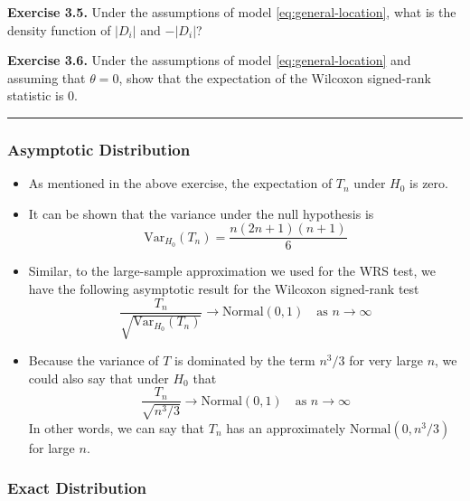 \documentclass[]{book}
\begin{document}
\textbf{Exercise 3.5.} Under the assumptions of model \eqref{eq:general-location}, what is
the density function of \(|D_{i}|\) and \(-|D_{i}|\)?

\textbf{Exercise 3.6.} Under the assumptions of model \eqref{eq:general-location} and
assuming that \(\theta = 0\), show that the expectation of the Wilcoxon signed-rank
statistic is \(0\).

\begin{center}\rule{0.5\linewidth}{\linethickness}\end{center}

\hypertarget{asymptotic-distribution}{%
\subsubsection{Asymptotic Distribution}\label{asymptotic-distribution}}

\begin{itemize}
\item
  As mentioned in the above exercise, the expectation of \(T_{n}\) under \(H_{0}\) is zero.
\item
  It can be shown that the variance under the null hypothesis is
  \begin{equation}
  \textrm{Var}_{H_{0}}( T_{n} ) = \frac{n(2n + 1)(n + 1)}{6} \nonumber
  \end{equation}
\item
  Similar, to the large-sample approximation we used for the WRS test, we have the following
  asymptotic result for the Wilcoxon signed-rank test
  \begin{equation}
  \frac{T_{n}}{\sqrt{\textrm{Var}_{H_{0}}(T_{n}) }} \longrightarrow \textrm{Normal}(0,1) \quad \textrm{as } n \longrightarrow \infty
  \end{equation}
\item
  Because the variance of \(T\) is dominated by the term \(n^{3}/3\) for very large \(n\), we could also say that under \(H_{0}\)
  that
  \begin{equation}
  \frac{T_{n}}{\sqrt{n^{3}/3} } \longrightarrow \textrm{Normal}(0,1) \quad \textrm{as } n \longrightarrow \infty
  \end{equation}
  In other words, we can say that \(T_{n}\) has an approximately \(\textrm{Normal}(0, n^{3}/3)\) for large \(n\).
\end{itemize}

\hypertarget{exact-distribution}{%
\subsubsection{Exact Distribution}\label{exact-distribution}}
\end{document}
